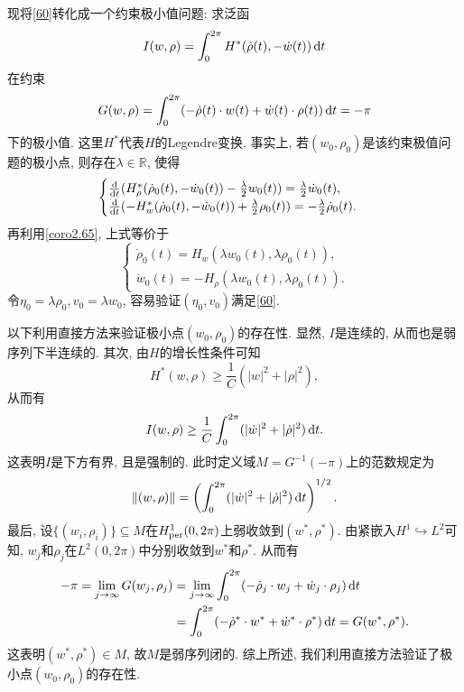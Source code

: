 现将\eqref{60}转化成一个约束极小值问题: 求泛函 
\begin{equation*}
    I(w, \rho) = \int_0^{2\pi}H^*(\dot\rho(t), -\dot w(t)) \,{\rm d}t
\end{equation*}
在约束 
\begin{equation*}
    G(w, \rho) = \int_0^{2\pi}(-\dot\rho(t) \cdot w(t) + \dot w(t) \cdot \rho(t)) \,{\rm d}t = -\pi
\end{equation*}
下的极小值. 这里$H^*$代表$H$的Legendre变换. 事实上, 若$(w_0, \rho_0)$是该约束极值问题的极小点, 则存在$\lambda \in \mathbb{R}$, 使得 
\begin{equation*}
    \begin{cases}
        \frac{{\rm d}}{{\rm d}t}(H_{\rho}^*(\dot\rho_0(t), -\dot w_0(t)) - \frac{\lambda}{2} w_0(t)) = \frac{\lambda}{2} \dot w_0(t), \\ 
        \frac{{\rm d}}{{\rm d}t}(-H_w^*(\dot\rho_0(t), -\dot w_0(t)) + \frac{\lambda}{2}\rho_0(t)) = -\frac{\lambda}{2} \dot\rho_0(t).
    \end{cases}
\end{equation*}
再利用\ref{coro2.65}, 上式等价于 
\begin{equation*}
    \begin{cases}
        \dot\rho_0(t) = H_w(\lambda w_0(t), \lambda\rho_0(t)), \\
        \dot w_0(t) = -H_{\rho}(\lambda w_0(t), \lambda\rho_0(t)).
    \end{cases}
\end{equation*}
令$\eta_0 = \lambda\rho_0, v_0 = \lambda w_0$, 容易验证$(\eta_0, v_0)$满足\eqref{60}.

以下利用直接方法来验证极小点$(w_0, \rho_0)$的存在性. 显然, $I$是连续的, 从而也是弱序列下半连续的.
其次, 由$H$的增长性条件可知 
\begin{equation*}
    H^*(w, \rho) \geq \frac{1}{C}(|w|^2 + |\rho|^2),
\end{equation*}
从而有 
\begin{equation*}
    I(w, \rho) \geq \frac{1}{C}\int_0^{2\pi}(|\dot w|^2 + |\dot \rho|^2) \,{\rm d}t.
\end{equation*}
这表明$I$是下方有界, 且是强制的. 此时定义域$M = G^{-1}(-\pi)$上的范数规定为 
\begin{equation*}
    \Vert (w, \rho)\Vert = \left(\int_0^{2\pi}(|\dot w|^2 + |\dot \rho|^2) \,{\rm d}t\right)^{1/2}.
\end{equation*}
最后, 设$\{(w_i, \rho_i)\} \subseteq M$在$H_{{\rm per}}^1(0, 2\pi)$上弱收敛到$(w^*, \rho^*)$.
由紧嵌入$H^1 \hookrightarrow L^2$可知, $w_j$和$\rho_j$在$L^2(0, 2\pi)$中分别收敛到$w^*$和$\rho^*$.
从而有 
\begin{align*}
    -\pi = \lim\limits_{j \rightarrow \infty}G(w_j, \rho_j) &= \lim\limits_{j \rightarrow \infty}\int_0^{2\pi}(-\dot\rho_j \cdot w_j + \dot w_j \cdot \rho_j) \,{\rm d}t \\ 
    &= \int_0^{2\pi}(-\dot\rho^* \cdot w^* + \dot w^* \cdot \rho^*) \,{\rm d}t = G(w^*, \rho^*).
\end{align*}
这表明$(w^*, \rho^*) \in M$, 故$M$是弱序列闭的. 综上所述, 我们利用直接方法验证了极小点$(w_0, \rho_0)$的存在性.

